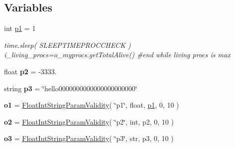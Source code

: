 \subsection*{Variables}
\begin{DoxyCompactItemize}
\item 
int \hyperlink{namespacenegui_1_1pgutilityclasses_af03bb9226272b714c1db572575aa8a71}{p1} = 1
\begin{DoxyCompactList}\small\item\em time.\+sleep( S\+L\+E\+E\+P\+T\+I\+M\+E\+P\+R\+O\+C\+C\+H\+E\+C\+K ) i\+\_\+living\+\_\+procs=o\+\_\+myprocs.\+get\+Total\+Alive() \#end while living procs is max \end{DoxyCompactList}\item 
float {\bfseries p2} = -\/3333.\hypertarget{namespacenegui_1_1pgutilityclasses_a8124b15d70de1d7150ce8692fb552fd1}{}\label{namespacenegui_1_1pgutilityclasses_a8124b15d70de1d7150ce8692fb552fd1}

\item 
string {\bfseries p3} = \char`\"{}hello0000000000000000000000\char`\"{}\hypertarget{namespacenegui_1_1pgutilityclasses_a5fb2b85f6fb0e558546aeb9152997f75}{}\label{namespacenegui_1_1pgutilityclasses_a5fb2b85f6fb0e558546aeb9152997f75}

\item 
{\bfseries o1} = \hyperlink{classnegui_1_1pgutilityclasses_1_1FloatIntStringParamValidity}{Float\+Int\+String\+Param\+Validity}( \char`\"{}p1\char`\"{}, float, \hyperlink{namespacenegui_1_1pgutilityclasses_af03bb9226272b714c1db572575aa8a71}{p1}, 0, 10 )\hypertarget{namespacenegui_1_1pgutilityclasses_a114d940c9deebe304d239dbd0217bc9e}{}\label{namespacenegui_1_1pgutilityclasses_a114d940c9deebe304d239dbd0217bc9e}

\item 
{\bfseries o2} = \hyperlink{classnegui_1_1pgutilityclasses_1_1FloatIntStringParamValidity}{Float\+Int\+String\+Param\+Validity}( \char`\"{}p2\char`\"{}, int, p2, 0, 10 )\hypertarget{namespacenegui_1_1pgutilityclasses_ae040e39a28af0b0863090925571ef623}{}\label{namespacenegui_1_1pgutilityclasses_ae040e39a28af0b0863090925571ef623}

\item 
{\bfseries o3} = \hyperlink{classnegui_1_1pgutilityclasses_1_1FloatIntStringParamValidity}{Float\+Int\+String\+Param\+Validity}( \char`\"{}p3\char`\"{}, str, p3, 0, 10 )\hypertarget{namespacenegui_1_1pgutilityclasses_ab69ca5fc889a392bd0eec3e1effb4293}{}\label{namespacenegui_1_1pgutilityclasses_ab69ca5fc889a392bd0eec3e1effb4293}

\end{DoxyCompactItemize}


